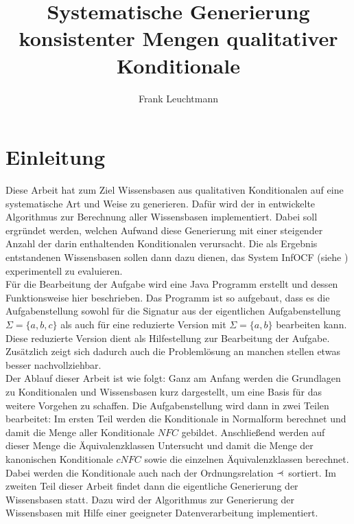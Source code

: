 \documentclass[12pt,a4paper]{article}
\author{Frank Leuchtmann}
\title{Systematische Generierung konsistenter Mengen qualitativer
Konditionale}
\newcommand\rdotl{\mathrel{%
    \mathchoice{\RQEQ}{\RQEQ}{\RQEQ}{\RQEQ}%
}}
\def\RQEQ{{%
    \setbox0\hbox{$\prec$}%
    \rlap{\hbox to \wd0{\hss \raisebox {0.01pt}{$\ \cdot$\hss}}}\box0
}}
\begin{document}
\maketitle
\newpage
\tableofcontents
\newpage





\section{Einleitung}

Diese Arbeit hat zum Ziel Wissensbasen aus qualitativen Konditionalen auf eine systematische Art und Weise zu generieren. Dafür wird der in \cite{beierle19} entwickelte Algorithmus zur Berechnung aller Wissensbasen implementiert. Dabei soll ergründet werden, welchen Aufwand diese Generierung mit einer steigender Anzahl der darin  enthaltenden Konditionalen verursacht. Die als Ergebnis entstandenen Wissensbasen sollen dann dazu dienen, das System InfOCF (siehe \cite{beierle17}) experimentell zu evaluieren. \\
Für die Bearbeitung der Aufgabe wird eine Java Programm erstellt und dessen Funktionsweise hier beschrieben. Das Programm ist so aufgebaut, dass es die Aufgabenstellung sowohl für die Signatur aus der eigentlichen Aufgabenstellung $\Sigma = \{a,b,c\}$ als auch für eine reduzierte Version mit $\Sigma = \{a,b\}$ bearbeiten kann. Diese reduzierte Version dient als Hilfestellung zur Bearbeitung der Aufgabe. Zusätzlich zeigt sich dadurch auch die Problemlösung an manchen stellen etwas besser nachvollziehbar. \\
Der Ablauf dieser Arbeit ist wie folgt: Ganz am Anfang werden die Grundlagen zu Konditionalen und Wissensbasen kurz dargestellt, um eine Basis für das weitere Vorgehen zu schaffen. Die Aufgabenstellung wird dann in zwei Teilen bearbeitet: Im ersten Teil werden die Konditionale in Normalform berechnet und damit die Menge aller Konditionale $NFC$ gebildet. Anschließend werden auf dieser Menge die Äquivalenzklassen Untersucht und damit die Menge der kanonischen Konditionale $cNFC$ sowie die einzelnen Äquivalenzklassen berechnet. Dabei werden die Konditionale auch nach der Ordnungsrelation $\rdotl$ sortiert. Im zweiten Teil dieser Arbeit findet dann die eigentliche Generierung der Wissensbasen statt. Dazu wird der Algorithmus zur Generierung der Wissensbasen mit Hilfe einer geeigneter Datenverarbeitung implementiert.\\
\end{document}
